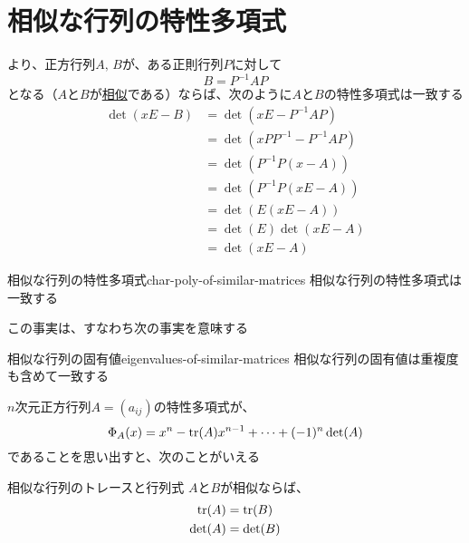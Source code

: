 \documentclass[../../../topic_linear-algebra]{subfiles}
\begin{document}
\sectionline
\section{相似な行列の特性多項式}

より、正方行列$A,\,B$が、ある正則行列$P$に対して
\begin{equation*}
  B = P^{-1}AP
\end{equation*}
となる（$A$と$B$が\hyperref[def:similar-matrices]{相似}である）ならば、次のように$A$と$B$の特性多項式は一致する
\begin{align*}
  \det(xE - B) & = \det(xE - P^{-1}AP)       \\
               & = \det(xPP^{-1} - P^{-1}AP) \\
               & = \det(P^{-1}P(x - A))      \\
               & = \det(P^{-1}P(xE - A))     \\
               & = \det(E(xE - A))           \\
               & = \det(E)\det(xE - A)       \\
               & = \det(xE - A)
\end{align*}

\begin{theorem}{相似な行列の特性多項式}{char-poly-of-similar-matrices}
  相似な行列の特性多項式は一致する
\end{theorem}

この事実は、すなわち次の事実を意味する

\begin{theorem}{相似な行列の固有値}{eigenvalues-of-similar-matrices}
  相似な行列の固有値は重複度も含めて一致する
\end{theorem}

\sectionline

$n$次元正方行列$A = (a_{ij})$の特性多項式が、
\begin{equation*}
  \Phi_A(x) = x^n - \tr(A)x^{n-1} + \cdots + (-1)^n \det(A)
\end{equation*}
であることを思い出すと、次のことがいえる

\begin{theorem*}{相似な行列のトレースと行列式}
  $A$と$B$が相似ならば、
  \begin{align*}
    \tr(A)  & = \tr(B)  \\
    \det(A) & = \det(B)
  \end{align*}
\end{theorem*}
\end{document}
